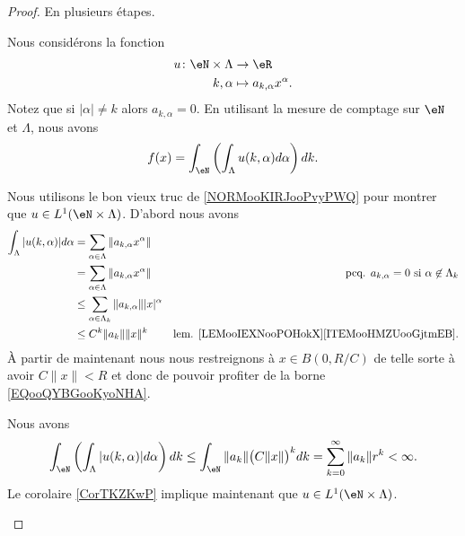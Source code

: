 \begin{proof}
	En plusieurs étapes.
	\begin{subproof}
		\spitem[La fonction \( u\)]

		Nous considérons la fonction
		\begin{equation}
			\begin{aligned}
				u\colon \eN\times \Lambda & \to \eR                          \\
				k,\alpha                  & \mapsto  a_{k,\alpha}x^{\alpha}.
			\end{aligned}
		\end{equation}
		Notez que si \( | \alpha |\neq k\) alors \( a_{k,\alpha}=0\). En utilisant la mesure de comptage sur \( \eN\) et \( \Lambda\), nous avons
		\begin{equation}
			f(x)=\int_{\eN}\left( \int_{\Lambda}u(k,\alpha)d\alpha \right)dk.
		\end{equation}

		Nous utilisons le bon vieux truc de \ref{NORMooKIRJooPvyPWQ} pour montrer que \( u\in L^1(\eN\times \Lambda)\). D'abord nous avons
		\begin{subequations}
			\begin{align}
				\int_{\Lambda}| u(k,\alpha) |d\alpha & =\sum_{\alpha\in\Lambda}\| a_{k,\alpha}x^{\alpha} \|                                                                           \\
				                                     & =\sum_{\alpha\in\Lambda}\| a_{k,\alpha}x^{\alpha} \|          & \text{pcq. \( a_{k,\alpha}=0\) si \( \alpha\not\in\Lambda_k\)} \\
				                                     & \leq\sum_{\alpha\in\Lambda_k}\| a_{k,\alpha} \|| x |^{\alpha}                                                                  \\
				                                     & \leq C^k\| a_k \|\| x \|^k                                    & \text{lem. \ref{LEMooIEXNooPOHokX}\ref{ITEMooHMZUooGjtmEB}.}
			\end{align}
		\end{subequations}
		À partir de maintenant nous nous restreignons à \( x\in B(0,R/C)\) de telle sorte à avoir \( C\| x \|<R\) et donc de pouvoir profiter de la borne \ref{EQooQYBGooKyoNHA}.

		Nous avons
		\begin{equation}		\label{EQooLCYMooGVECbX}
			\int_{\eN}\left( \int_{\Lambda}| u(k,\alpha) |d\alpha \right)dk\leq\int_{\eN}\| a_k \|\big( C\| x \| \big)^kdk=\sum_{k=0}^{\infty}\| a_k \|r^k<\infty.
		\end{equation}
		Le corolaire \ref{CorTKZKwP} implique maintenant que \( u\in L^1(\eN\times \Lambda)\).


\end{subproof}
\end{proof}
